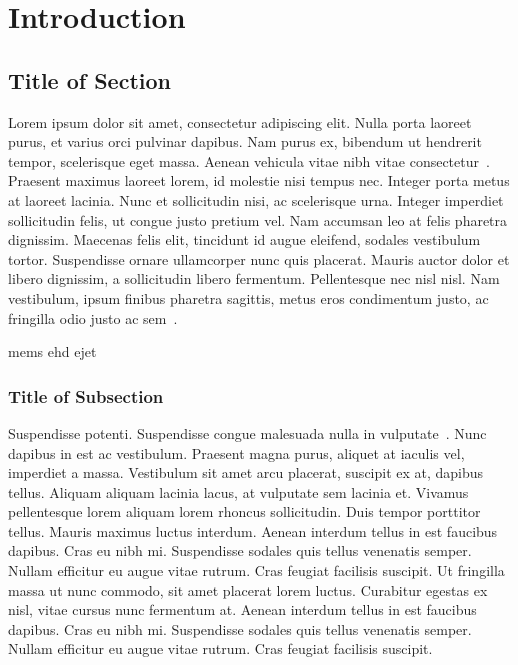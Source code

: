 
\chapter{Introduction}
\graphicspath{{Chapter_1/Vector/}{Chapter_1/}}

\lipsum[1-2]

\section{Title of Section}

Lorem ipsum dolor sit amet, consectetur adipiscing elit. Nulla porta laoreet purus, et varius orci pulvinar dapibus. Nam purus ex, bibendum ut hendrerit tempor, scelerisque eget massa. Aenean vehicula vitae nibh vitae consectetur~\cite{ErdelyiBook}. Praesent maximus laoreet lorem, id molestie nisi tempus nec. Integer porta metus at laoreet lacinia. Nunc et sollicitudin nisi, ac scelerisque urna. Integer imperdiet sollicitudin felis, ut congue justo pretium vel. Nam accumsan leo at felis pharetra dignissim. Maecenas felis elit, tincidunt id augue eleifend, sodales vestibulum tortor. Suspendisse ornare ullamcorper nunc quis placerat. Mauris auctor dolor et libero dignissim, a sollicitudin libero fermentum. Pellentesque nec nisl nisl. Nam vestibulum, ipsum finibus pharetra sagittis, metus eros condimentum justo, ac fringilla odio justo ac sem~\cite{ErdelyiBook,JakesBook,ExtonBook}.

\lipsum[2-3]
\acrfull{mems} \acrfull{ehd} \acrfull{ejet}

\subsection{Title of Subsection}
\lipsum[1]

Suspendisse potenti. Suspendisse congue malesuada nulla in vulputate~\cite{SrivastavaBook,PrudnikovBookv4}. Nunc dapibus in est ac vestibulum. Praesent magna purus, aliquet at iaculis vel, imperdiet a massa. Vestibulum sit amet arcu placerat, suscipit ex at, dapibus tellus. Aliquam aliquam lacinia lacus, at vulputate sem lacinia et. Vivamus pellentesque lorem aliquam lorem rhoncus sollicitudin. Duis tempor porttitor tellus. Mauris maximus luctus interdum\cite{LeeBook1998,RyzhikBook,Hoyt-1947Probability}. Aenean interdum tellus in est faucibus dapibus. Cras eu nibh mi. Suspendisse sodales quis tellus venenatis semper. Nullam efficitur eu augue vitae rutrum. Cras feugiat facilisis suscipit. Ut fringilla massa ut nunc commodo, sit amet placerat lorem luctus. Curabitur egestas ex nisl, vitae cursus nunc fermentum at. Aenean interdum tellus in est faucibus dapibus. Cras eu nibh mi. Suspendisse sodales quis tellus venenatis semper. Nullam efficitur eu augue vitae rutrum. Cras feugiat facilisis suscipit.

